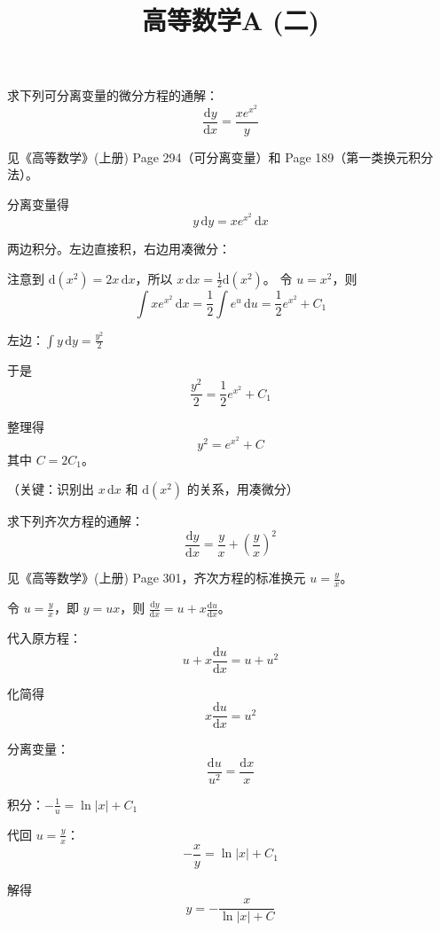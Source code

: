 \documentclass[answer]{THUExam}
\title{高等数学A (二)}
\author{}
\begin{document}
\vspace{1cm}
\makehead

\vspace{1cm}


\begin{problem}
求下列可分离变量的微分方程的通解：
$$\frac{\mathrm{d}y}{\mathrm{d}x} = \frac{x e^{x^2}}{y}$$
\end{problem}
\begin{note}
    见《高等数学》(上册) Page 294（可分离变量）和 Page 189（第一类换元积分法）。
\end{note}
\begin{solution}
    分离变量得
    $$y\,\mathrm{d}y = x e^{x^2}\,\mathrm{d}x$$
    
    两边积分。左边直接积，右边用凑微分：
    
    注意到 $\mathrm{d}(x^2) = 2x\,\mathrm{d}x$，所以 $x\,\mathrm{d}x = \frac{1}{2}\mathrm{d}(x^2)$。
    令 $u = x^2$，则
    $$\int x e^{x^2}\,\mathrm{d}x = \frac{1}{2}\int e^u\,\mathrm{d}u = \frac{1}{2}e^{x^2} + C_1$$
    
    左边：$\int y\,\mathrm{d}y = \frac{y^2}{2}$
    
    于是
    $$\frac{y^2}{2} = \frac{1}{2}e^{x^2} + C_1$$
    
    整理得
    $$\boxed{y^2 = e^{x^2} + C}$$
    其中 $C = 2C_1$。
    
    （关键：识别出 $x\,\mathrm{d}x$ 和 $\mathrm{d}(x^2)$ 的关系，用凑微分）
\end{solution}
\bigskip

\begin{problem}
求下列齐次方程的通解：
$$\frac{\mathrm{d}y}{\mathrm{d}x} = \frac{y}{x} + \left(\frac{y}{x}\right)^2$$
\end{problem}
\begin{note}
    见《高等数学》(上册) Page 301，齐次方程的标准换元 $u = \frac{y}{x}$。
\end{note}
\begin{solution}
    令 $u = \frac{y}{x}$，即 $y = ux$，则 $\frac{\mathrm{d}y}{\mathrm{d}x} = u + x\frac{\mathrm{d}u}{\mathrm{d}x}$。
    
    代入原方程：
    $$u + x\frac{\mathrm{d}u}{\mathrm{d}x} = u + u^2$$
    
    化简得
    $$x\frac{\mathrm{d}u}{\mathrm{d}x} = u^2$$
    
    分离变量：
    $$\frac{\mathrm{d}u}{u^2} = \frac{\mathrm{d}x}{x}$$
    
    积分：$-\frac{1}{u} = \ln|x| + C_1$
    
    代回 $u = \frac{y}{x}$：
    $$-\frac{x}{y} = \ln|x| + C_1$$
    
    解得
    $$\boxed{y = -\frac{x}{\ln|x| + C}}$$
\end{solution}
\bigskip
\end{document}
